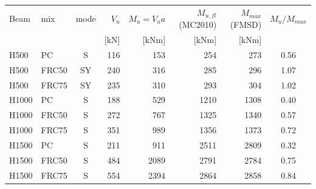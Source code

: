 \begin{tabular}{l l c r r r r c}
\toprule
Beam & mix & mode & $V_u$ & $M_u=V_u a$ & $M_{u,fl}$ (MC2010) & $M_{max}$ (FMSD) & $M_u/M_{max}$\\
 & & & [kN] & [kNm] & [kNm] & [kNm] & \\
\midrule
H500 & PC & S & 116 & 153 & 254 & 273 & 0.56\\
H500 & FRC50 & SY & 240 & 316 & 285 & 296 & 1.07\\
H500 & FRC75 & SY & 235 & 310 & 293 & 304 & 1.02\\
H1000 & PC & S & 188 & 529 & 1210 & 1308 & 0.40\\
H1000 & FRC50 & S & 272 & 767 & 1325 & 1340 & 0.57\\
H1000 & FRC75 & S & 351 & 989 & 1356 & 1373 & 0.72\\
H1500 & PC & S & 211 & 911 & 2511 & 2809 & 0.32\\
H1500 & FRC50 & S & 484 & 2089 & 2791 & 2784 & 0.75\\
H1500 & FRC75 & S & 554 & 2394 & 2864 & 2858 & 0.84\\
\bottomrule
\end{tabular}
